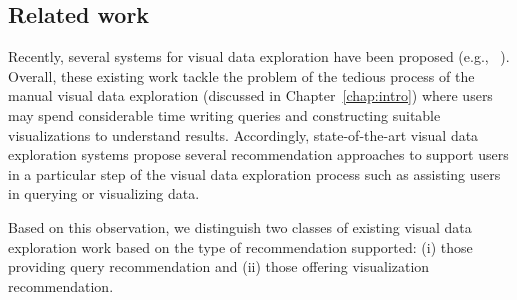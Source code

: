 \subsection{Related work} 
\label{sec:EDA}
Recently, several systems for visual data exploration have been proposed (e.g.,%
~\cite{Vartak,Sellam:16,Tang:2017,Milo:2016,Milo:2018,Mackinlay:2007,Mutlu:2016,Wongsuphasawat2016,Wongsuphasawat:2017}). Overall, these existing work tackle the problem of the tedious process of the manual visual data exploration (discussed in Chapter~\ref{chap:intro}) where users may spend considerable time writing queries and constructing suitable visualizations to understand results.
Accordingly, state-of-the-art visual data exploration systems propose several recommendation approaches to support users in a particular step of the visual data exploration process such as assisting users in querying or visualizing data.  

Based on this observation, we distinguish two classes of existing visual data exploration work based on the type of recommendation supported: (i) those providing query recommendation and (ii) those offering visualization recommendation.




